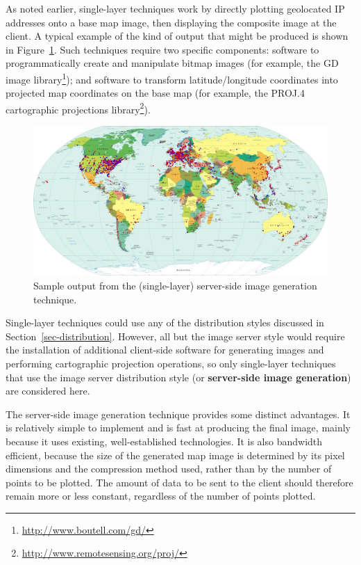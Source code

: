 \documentclass[acmnow]{acmtrans2m}
\begin{document}
As noted earlier, single-layer techniques work by directly plotting
geolocated IP addresses onto a base map image, then displaying the
composite image at the client. A typical example of the kind of output
that might be produced is shown in Figure~\ref{fig-image}. Such
techniques require two specific components: software to programmatically
create and manipulate bitmap images (for example, the GD image
library\footnote{\url{http://www.boutell.com/gd/}}); and software to
transform latitude/longitude coordinates into projected map coordinates
on the base map (for example, the PROJ.4 cartographic projections
library\footnote{\url{http://www.remotesensing.org/proj/}}).


\begin{figure}
	\centering
	\includegraphics[width=\textwidth,keepaspectratio]{ImageGeneration-full}
	\caption{Sample output from the (single-layer) server-side image
		generation technique.}
	\label{fig-image}
\end{figure}


Single-layer techniques could use any of the distribution styles
discussed in Section~\ref{sec-distribution}. However, all but the image
server style would require the installation of additional client-side
software for generating images and performing cartographic projection
operations, so only single-layer techniques that use the image server
distribution style (or \textbf{server-side image generation}) are
considered here.

The server-side image generation technique provides some distinct
advantages. It is relatively simple to implement and is fast at
producing the final image, mainly because it uses existing,
well-established technologies. It is also bandwidth efficient, because
the size of the generated map image is determined by its pixel
dimensions and the compression method used, rather than by the number of
points to be plotted. The amount of data to be sent to the client should
therefore remain more or less constant, regardless of the number of
points plotted.
\end{document}
